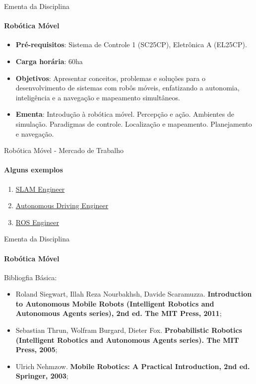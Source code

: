 \documentclass[aspectratio=169]{beamer}
\begin{document}
\begin{frame}[c]{Ementa da Disciplina}
	\framesubtitle{Robótica Móvel}

	\begin{block}{}
		\begin{itemize}
			\item \textbf{Pré-requisitos}: Sistema de Controle 1 (SC25CP), Eletrônica A (EL25CP).
			\item \textbf{Carga horária}: 60ha
			\item \textbf{Objetivos}: Apresentar conceitos, problemas e soluções para o desenvolvimento de sistemas com robôs móveis, enfatizando a autonomia, inteligência e a navegação e mapeamento simultâneos.
			\item \textbf{Ementa}: Introdução à robótica móvel. Percepção e ação. Ambientes de simulação.
			      Paradigmas de controle. Localização e mapeamento. Planejamento e navegação.
		\end{itemize}
	\end{block}
\end{frame}


\begin{frame}[t]{Robótica Móvel - Mercado de Trabalho}
	\framesubtitle{Alguns exemplos}

	\begin{enumerate}
		\item \href{https://www.indeed.com/q-Slam-Engineer-jobs.html}{SLAM Engineer}
		\item \href{https://www.indeed.com/q-Autonomous-Driving-Engineer-jobs.html}{Autonomous Driving Engineer}
		\item \href{http://wiki.ros.org/Jobs}{ROS Engineer}
	\end{enumerate}
\end{frame}


\begin{frame}[c]{Ementa da Disciplina}
	\framesubtitle{Robótica Móvel}

	\begin{block}{Bibliogfia Básica:}
	\end{block}
	\begin{itemize}
		\justifying
		\item Roland Siegwart, Illah Reza Nourbakhsh, Davide Scaramuzza. \textbf{Introduction to Autonomous Mobile Robots (Intelligent Robotics and Autonomous Agents series), 2nd ed. The MIT Press, 2011};
		\item Sebastian Thrun, Wolfram Burgard, Dieter Fox. \textbf{Probabilistic Robotics (Intelligent Robotics and Autonomous Agents series). The MIT Press, 2005};
		\item Ulrich Nehmzow. \textbf{Mobile Robotics: A Practical Introduction, 2nd ed. Springer, 2003};
	\end{itemize}
\end{frame}
\end{document}
